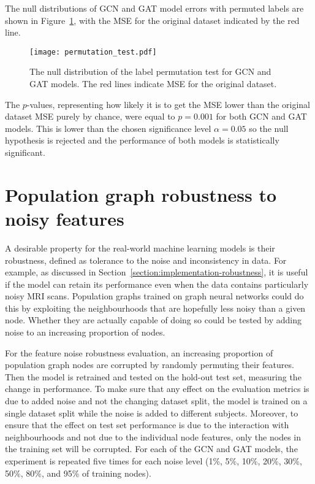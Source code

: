 The null distributions of GCN and GAT model errors with permuted labels are shown in Figure~\ref{figure:permutation-test}, with the MSE for the original dataset indicated by the red line.

\begin{figure}[h]
    \centering
    \texttt{[image: permutation\_test.pdf]}
    \caption{The null distribution of the label permutation test for GCN and GAT models. The red lines indicate MSE for the original dataset.}\label{figure:permutation-test}
\end{figure}

The $p$-values, representing how likely it is to get the MSE lower than the original dataset MSE purely by chance, were equal to $p=0.001$ for both GCN and GAT models. This is lower than the chosen significance level $\alpha=0.05$ so the null hypothesis is rejected and the performance of both models is statistically significant.


\section{Population graph robustness to noisy features}
A desirable property for the real-world machine learning models is their robustness, defined as tolerance to the noise and inconsistency in data.
For example, as discussed in Section~\ref{section:implementation-robustness}, it is useful if the model can retain its performance even when the data contains particularly noisy MRI scans. Population graphs trained on graph neural networks could do this by exploiting the neighbourhoods that are hopefully less noisy than a given node. Whether they are actually capable of doing so could be tested by adding noise to an increasing proportion of nodes. 

For the feature noise robustness evaluation, an increasing proportion of population graph nodes are corrupted by randomly permuting their features. Then the model is retrained and tested on the hold-out test set, measuring the change in performance. To make sure that any effect on the evaluation metrics is due to added noise and not the changing dataset split, the model is trained on a single dataset split while the noise is added to different subjects. Moreover, to ensure that the effect on test set performance is due to the interaction with neighbourhoods and not due to the individual node features, only the nodes in the training set will be corrupted. For each of the GCN and GAT models, the experiment is repeated five times for each noise level (1\%, 5\%, 10\%, 20\%, 30\%, 50\%, 80\%, and 95\% of training nodes).


